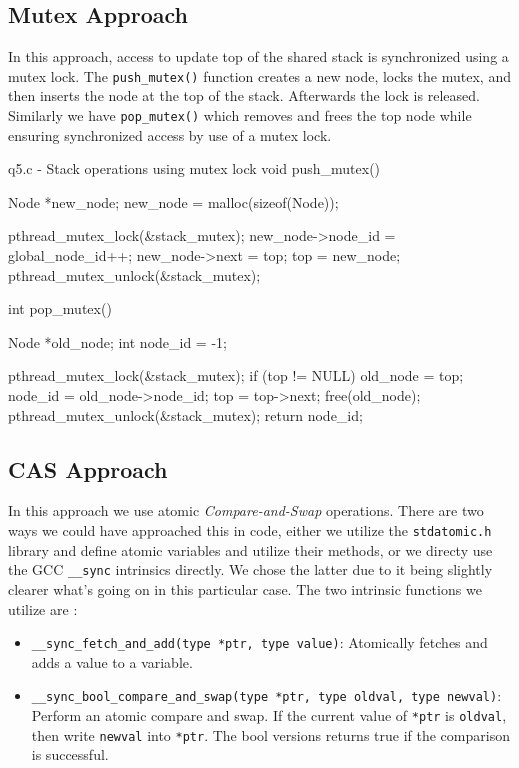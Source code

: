 \documentclass[../main.tex]{subfiles}
\begin{document}
\subsection*{Mutex Approach}

In this approach, access to update top of the shared stack is synchronized using a mutex lock. The \texttt{push\_mutex()} function creates a new node, locks the mutex, and then inserts the node at the top of the stack. Afterwards the lock is released. Similarly we have \texttt{pop\_mutex()} which removes and frees the top node while ensuring synchronized access by use of a mutex lock.

\begin{cppcode}{q5.c - Stack operations using mutex lock}
void push_mutex() {
    Node *new_node;
    new_node = malloc(sizeof(Node));

    pthread_mutex_lock(&stack_mutex);
    new_node->node_id = global_node_id++;
    new_node->next = top;
    top = new_node;
    pthread_mutex_unlock(&stack_mutex);
}

int pop_mutex() {
    Node *old_node;
    int node_id = -1;

    pthread_mutex_lock(&stack_mutex);
    if (top != NULL) {
        old_node = top;
        node_id = old_node->node_id;
        top = top->next;
        free(old_node);
    }
    pthread_mutex_unlock(&stack_mutex);
    return node_id;
}
\end{cppcode}

\subsection*{CAS Approach}

In this approach we use atomic \textit{Compare-and-Swap} operations. There are two ways we could have approached this in code, either we utilize the \texttt{stdatomic.h} library and define atomic variables and utilize their methods, or we directy use the GCC \texttt{\_\_sync} intrinsics directly. We chose the latter due to it being slightly clearer what's going on in this particular case. The two intrinsic functions we utilize are \cite{gcc_sync_builtins}:

\begin{itemize}
    \item \texttt{\_\_sync\_fetch\_and\_add(type *ptr, type value)}: Atomically fetches and adds a value to a variable.
    \item \texttt{\_\_sync\_bool\_compare\_and\_swap(type *ptr, type oldval, type newval)}: Perform an atomic compare and swap. If the current value of \texttt{*ptr} is \texttt{oldval}, then write \texttt{newval} into \texttt{*ptr}. The bool versions returns true if the comparison is successful.
\end{itemize}
\end{document}
